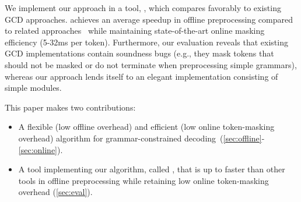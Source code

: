 % 


We implement our approach in a tool, \name, which compares favorably to existing GCD approaches.
\name achieves an average \nx speedup in offline preprocessing compared to related approaches~\cite{ugare2024syncode} while maintaining state-of-the-art online masking efficiency (5-32ms per token).
% 
Furthermore, our evaluation reveals that existing GCD implementations contain soundness bugs (e.g., they mask tokens that should not be masked or do not terminate when preprocessing simple grammars), whereas our approach lends itself to an elegant implementation consisting of simple modules.

This paper makes two contributions:
\begin{itemize}
\item A flexible (low offline overhead) and efficient (low online token-masking overhead) algorithm for grammar-constrained decoding~(\autoref{sec:offline}-\ref{sec:online}).
\item A tool implementing our algorithm, called \name, that is up to \nx faster than other tools in offline preprocessing while retaining low online token-masking overhead (\autoref{sec:eval}).
\end{itemize}



